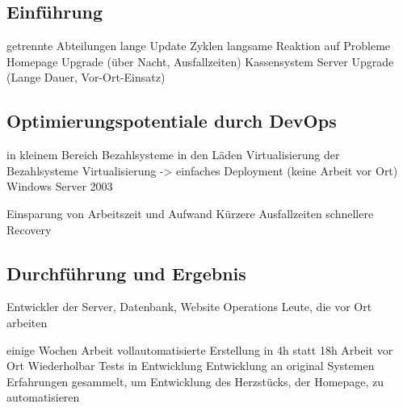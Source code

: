 \subsection{Einführung}
getrennte Abteilungen
lange Update Zyklen
langsame Reaktion auf Probleme
Homepage Upgrade (über Nacht, Ausfallzeiten)
Kassensystem Server Upgrade (Lange Dauer, Vor-Ort-Einsatz)

\subsection{Optimierungspotentiale durch DevOps}
in kleinem Bereich
Bezahlsysteme in den Läden
Virtualisierung der Bezahlsysteme
Virtualisierung -> einfaches Deployment (keine Arbeit vor Ort)
Windows Server 2003

Einsparung von Arbeitszeit und Aufwand
Kürzere Ausfallzeiten
schnellere Recovery

\subsection{Durchführung und Ergebnis}
Entwickler der Server, Datenbank, Website
Operations Leute, die vor Ort arbeiten

einige Wochen Arbeit
vollautomatisierte Erstellung in 4h statt 18h Arbeit vor Ort
Wiederholbar
Tests in Entwicklung
Entwicklung an original Systemen
Erfahrungen gesammelt, um Entwicklung des Herzstücks, der Homepage, zu automatisieren
